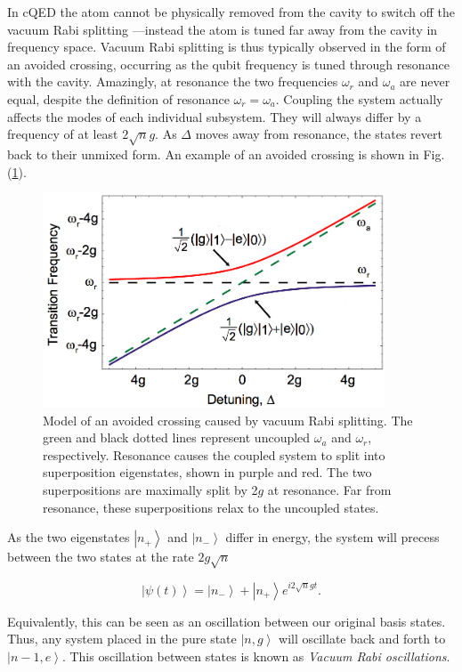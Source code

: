 \documentclass[11 pt, oneside]{book} %
\newcommand{\ket}[1]{\left| #1 \right>} %
\begin{document}
In cQED the atom cannot be physically removed from the cavity to switch off the vacuum Rabi splitting —instead the atom is tuned far away from the cavity in frequency space. Vacuum Rabi splitting is thus typically observed in the form of an avoided crossing, occurring as the qubit frequency is tuned through resonance with the cavity\cite{Bishop}. Amazingly, at resonance the two frequencies $\omega_r$ and $\omega_a$ are never equal, despite the definition of resonance $\omega_r=\omega_a$. Coupling the system actually affects the modes of each individual subsystem. They will always differ by a frequency of at least $2\sqrt{n}g$. As $\Delta$ moves away from resonance, the states revert back to their unmixed form. An example of an avoided crossing is shown in Fig. (\ref{fig:AvoidedCrossing}).

\begin{figure}[h] 
   \centering
   \includegraphics[width=4in]{SchusterAvoidedCrossing.png}%
   \caption[Model of vacuum Rabi splitting]{Model of an avoided crossing caused by vacuum Rabi splitting. The green and black dotted lines represent uncoupled $\omega_a$ and $\omega_r$, respectively. Resonance causes the coupled system to split into superposition eigenstates, shown in purple and red. The two superpositions are maximally split by 2$g$ at resonance. Far from resonance, these superpositions relax to the uncoupled states.}
   \label{fig:AvoidedCrossing}
\end{figure}

As the two eigenstates $\ket{n_+}$ and $\ket{n_-}$ differ in energy, the system will precess between the two states at the rate $2g\sqrt{n}$

\begin{equation}
\ket{\psi(t)}=\ket{n_-}+\ket{n_+}e^{i2\sqrt{n}gt}.
\end{equation}

Equivalently, this can be seen as an oscillation between our original basis states. Thus, any system placed in the pure state $\ket{n,g}$ will oscillate back and forth to $\ket{n-1,e}$. This oscillation between states is known as \emph{Vacuum Rabi oscillations}. 
\end{document}
